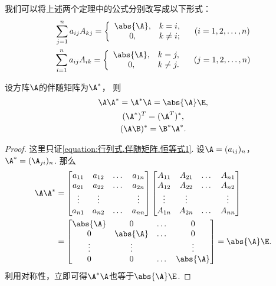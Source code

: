 我们可以将上述两个定理中的公式分别改写成以下形式：
\begin{gather}
	\sum_{j=1}^n a_{ij} A_{kj} = \left\{ \begin{array}{cl}
		\abs{\A}, & k = i, \\
		0, & k \neq i;
	\end{array} \right.
	\quad(i=1,2,\dotsc,n) \\%
	\sum_{i=1}^n a_{ij} A_{ik} = \left\{ \begin{array}{cl}
		\abs{\A}, & k = j, \\
		0, & k \neq j.
	\end{array} \right.
	\quad(j=1,2,\dotsc,n)
\end{gather}

\begin{theorem}
设方阵\(\A\)的伴随矩阵为\(\A^*\)，
则\begin{gather}
	\A \A^* = \A^* \A = \abs{\A} \E, \label{equation:行列式.伴随矩阵.恒等式1} \\
	(\A^*)^T = (\A^T)^*, \label{equation:行列式.伴随矩阵.恒等式2} \\
	(\A\B)^* = \B^* \A^*. \label{equation:行列式.伴随矩阵.恒等式3}
\end{gather}
\begin{proof}
这里只证\cref{equation:行列式.伴随矩阵.恒等式1}.
设\(\A=(a_{ij})_n\)，\(\A^*=(\A_{ji})_n\).
那么\begin{align*}
	\A\A^*
	&= \begin{bmatrix}
		a_{11} & a_{12} & \dots & a_{1n} \\
		a_{21} & a_{22} & \dots & a_{2n} \\
		\vdots & \vdots & & \vdots \\
		a_{n1} & a_{n2} & \dots & a_{nn} \\
	\end{bmatrix}
	\begin{bmatrix}
		A_{11} & A_{21} & \dots & A_{n1} \\
		A_{12} & A_{22} & \dots & A_{n2} \\
		\vdots & \vdots & & \vdots \\
		A_{1n} & A_{2n} & \dots & A_{nn}
	\end{bmatrix} \\
	&= \begin{bmatrix}
		\abs{\A} & 0 & \dots & 0 \\
		0 & \abs{\A} & \dots & 0 \\
		\vdots & \vdots & & \vdots \\
		0 & 0 & \dots & \abs{\A}
	\end{bmatrix}
	= \abs{\A} \E.
\end{align*}
利用对称性，立即可得\(\A^*\A\)也等于\(\abs{\A} \E\).
\end{proof}
\end{theorem}


